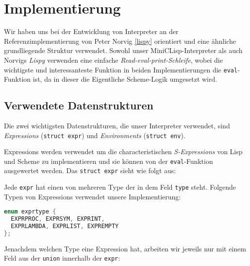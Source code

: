 \label{implementierung}
\section[Implementierung]{Implementierung}

Wir haben uns bei der Entwicklung von Interpreter an der Referenzimplementierung
von Peter Norvig \ref{lispy} orientiert und eine ähnliche grundliegende
Struktur verwendet. Sowohl unser MiniCLisp-Interpreter als auch Norvigs
\emph{Lispy} verwenden eine einfache \emph{Read-eval-print-Schleife}, wobei
die wichtigste und interessanteste Funktion in beiden Implementierungen die
\texttt{eval}-Funktion ist, da in dieser die Eigentliche Scheme-Logik
umgesetzt wird.

\subsection[Datenstrukturen]{Verwendete Datenstrukturen}
\label{datenstrukturen}
Die zwei wichtigsten Datenstrukturen, die unser Interpreter verwendet, sind 
\emph{Expressions} (\texttt{struct expr}) und \emph{Environments} (\texttt{struct env}).
\par
Expressions werden verwendet um die characteristischen \emph{S-Expressions} von
Lisp und Scheme zu implementieren und sie können von der \texttt{eval}-Funktion
ausgewertet werden. Das \texttt{struct expr} sieht wie folgt aus:

Jede \texttt{expr} hat einen von mehreren Type der in dem Feld \texttt{type}
steht. Folgende Typen von Expressions verwendet unsere Implementierung:
\begin{lstlisting}[language=C]
enum exprtype {
  EXPRPROC, EXPRSYM, EXPRINT,
  EXPRLAMBDA, EXPRLIST, EXPREMPTY
};
\end{lstlisting}
Jenachdem welchen Type eine Expression hat, arbeiten wir jeweils nur mit einem
Feld aus der \texttt{union} innerhalb der \texttt{expr}:
